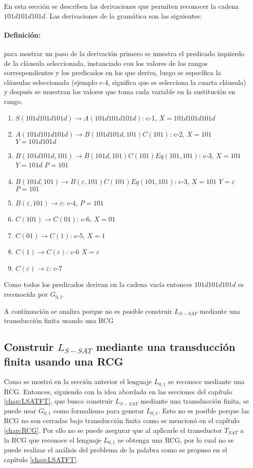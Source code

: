 \documentclass[12pt]{article}
\begin{document}
En esta sección se describen las derivaciones que permiten reconocer la cadena $101d101d101d$. Las derivaciones
de la gramática son las siguientes:

\paragraph{Definición:} para mostrar un paso de la derivación primero se muestra el predicado izquierdo de la cláusula
seleccionada, instanciado con los valores de los rangos correspondientes y los predicados en los que deriva, luego se específica la cláusulas seleccionada
(ejemplo c-4, significa que se selecciona la cuarta cláusula) y después se muestran los valores que toma cada variable
en la sustitución en rango.

\begin{enumerate}
    \item $S(101d101d101d) \to A(101d101d101d)$: c-1, $X=101d101d101d$
    \item $A(101d101d101d) \to B(101d101d,101)C(101)$: c-2, $X=101$ $Y=101d101d$
    \item $B(101d101d,101) \to B(101d,101)C(101)Eq(101,101)$: c-3, $X=101$ $Y=101d$ $P=101$
    \item $B(101d,101) \to B(\varepsilon,101)C(101)Eq(101,101)$: c-3, $X=101$ $Y=\varepsilon$ $P=101$
    \item $B(\varepsilon,101) \to \varepsilon$: c-4, $P=101$
    \item $C(101)\to C(01)$: c-6, $X=01$
    \item $C(01)\to C(1)$: c-5, $X=1$
    \item $C(1)\to C(\varepsilon)$: c-6 $X=\varepsilon$
    \item $C(\varepsilon)\to \varepsilon$: c-7
\end{enumerate}

Como todos los predicados derivan en la cadena vacía entonces $101d101d101d$ es reconocida por $G_{0,1}$.

A continuación se analiza porque no es posible construir $L_{S-SAT}$ mediante una transducción finita usando
una RCG

\subsection{Construir $L_{S-SAT}$ mediante una transducción finita usando una RCG}

Como se mostró en la sección anterior el lenguaje $L_{0,1}$ se reconoce mediante una RCG.  Entonces,
siguiendo con la idea abordada en las secciones del capítulo \ref{chap:LSATFT}, que busca construir
$L_{S-SAT}$ mediante una transducción finita, se puede usar $G_{0,1}$ como formalismo para generar
$L_{0,1}$. Esto no es posible porque  las RCG no son cerradas bajo transducción finita como se mencionó en
el capítulo \ref{chap:RCG}.  Por ello no se puede asegurar que al aplicarle el transductor $T_{SAT}$
a la RCG que reconoce el lenguaje $L_{0,1}$ se obtenga una RCG, por lo cual no se puede realizar el
análisis del problema de la palabra como se propuso en el capítulo \ref{chap:LSATFT}.
\end{document}
